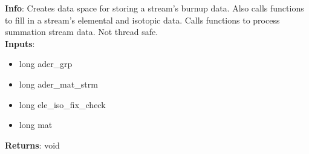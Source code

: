 \textbf{Info}: Creates data space for storing a stream's burnup data. Also
calls functions to fill in a stream's elemental and isotopic data. Calls
functions to process summation stream data. Not thread safe.\\

\noindent \textbf{Inputs}:
\begin{itemize}
\item{long ader\_grp}
\item{long ader\_mat\_strm}
\item{long ele\_iso\_fix\_check}
\item{long mat}
\end{itemize}

\noindent \textbf{Returns}: void
